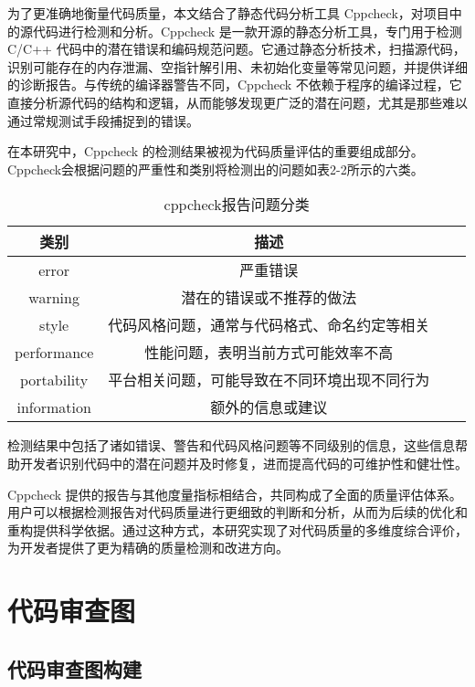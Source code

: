 为了更准确地衡量代码质量，本文结合了静态代码分析工具 Cppcheck，对项目中的源代码进行检测和分析。Cppcheck 是一款开源的静态分析工具，专门用于检测 C/C++ 代码中的潜在错误和编码规范问题。它通过静态分析技术，扫描源代码，识别可能存在的内存泄漏、空指针解引用、未初始化变量等常见问题，并提供详细的诊断报告。与传统的编译器警告不同，Cppcheck 不依赖于程序的编译过程，它直接分析源代码的结构和逻辑，从而能够发现更广泛的潜在问题，尤其是那些难以通过常规测试手段捕捉到的错误。

在本研究中，Cppcheck 的检测结果被视为代码质量评估的重要组成部分。Cppcheck会根据问题的严重性和类别将检测出的问题如表2-2所示的六类。

\begin{table}[htbp]
\caption{cppcheck报告问题分类}
\vspace{0.5em}\centering\wuhao
\begin{tabular}{cccc}
\toprule
类别 & 描述 \\
\midrule
error &  严重错误 \\
warning & 潜在的错误或不推荐的做法 \\
style & 代码风格问题，通常与代码格式、命名约定等相关 \\
performance & 性能问题，表明当前方式可能效率不高 \\ 
portability & 平台相关问题，可能导致在不同环境出现不同行为 \\
information & 额外的信息或建议 \\ 
\bottomrule
\end{tabular}
\end{table}

检测结果中包括了诸如错误、警告和代码风格问题等不同级别的信息，这些信息帮助开发者识别代码中的潜在问题并及时修复，进而提高代码的可维护性和健壮性。

Cppcheck 提供的报告与其他度量指标相结合，共同构成了全面的质量评估体系。用户可以根据检测报告对代码质量进行更细致的判断和分析，从而为后续的优化和重构提供科学依据。通过这种方式，本研究实现了对代码质量的多维度综合评价，为开发者提供了更为精确的质量检测和改进方向。



\section{代码审查图}

\subsection{代码审查图构建}

